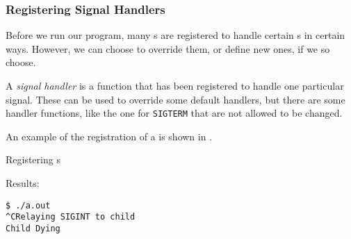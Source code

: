 \subsubsection{Registering Signal Handlers}\label{subsubsec:Register_Signal_Handlers}
Before we run our program, many s are registered to handle certain s in certain ways.
However, we can choose to override them, or define new ones, if we so choose.

\begin{definition}\label{def:Signal_Handler}
  A \emph{signal handler} is a function that has been registered to handle one particular signal.
  These can be used to override some default handlers, but there are some handler functions, like the one for \texttt{SIGTERM} that are not allowed to be changed.
\end{definition}

An example of the registration of a  is shown in .

\begin{listing}[h!tbp]
\caption{Registering s}
\label{lst:Register_Signal_Handler}

Results:
\begin{verbatim}
$ ./a.out
^CRelaying SIGINT to child
Child Dying
\end{verbatim}
\end{listing}

